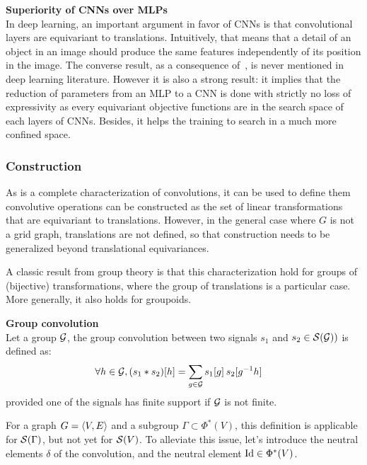 \begin{remark}\textbf{Superiority of CNNs over MLPs}\\
In deep learning, an important argument in favor of CNNs is that convolutional layers are equivariant to translations. Intuitively, that means that a detail of an object in an image should produce the same features independently of its position in the image. The converse result, as a consequence of~, is never mentioned in deep learning literature. However it is also a strong result: it implies that the reduction of parameters from an MLP to a CNN is done with strictly no loss of expressivity as every equivariant objective functions are in the search space of each layers of CNNs. Besides, it helps the training to search in a much more confined space.
\end{remark}

\subsubsection{Construction}

As  is a complete characterization of convolutions, it can be used to define them \ie convolutive operations can be constructed as the set of linear transformations that are equivariant to translations. However, in the general case where $G$ is not a grid graph, translations are not defined, so that construction needs to be generalized beyond translational equivariances.

A classic result from group theory is that this characterization hold for groups of (bijective) transformations, where the group of translations is a particular case. More generally, it also holds for groupoids.

\begin{definition}\textbf{Group convolution}\\
Let a group $\mathcal{G}$, the group convolution between two signals $s_1$ and $s_2 \in \mathcal{S}(\mathcal{G}))$ is defined as:
\begin{align*}
\forall h \in \group, (s_1 \ast s_2)[h] & = \displaystyle \sum_{g \in \group} s_1[g] \h{2} s_2[g^{-1}h]%
\end{align*}
provided one of the signals has finite support if $\mathcal{G}$ is not finite.
\end{definition}

For a graph $G = \langle V, E \rangle$ and a subgroup $\Gamma \subset \Phi^*(V)$, this definition is applicable for $\mathcal{S}(\Gamma)$, but not yet for $\mathcal{S}(V)$. To alleviate this issue, let's introduce the neutral elements $\delta$ of the convolution, and the neutral element $\operatorname{Id} \in \Phi^*(V)$.

